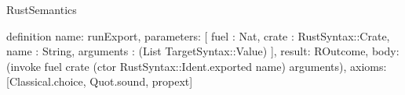 \begin{lexlean}{RustSemantics}
\begin{semanticmodule}
definition{
  name: runExport,
  parameters: [
    fuel : Nat,
    crate : RustSyntax::Crate,
    name : String,
    arguments : (List TargetSyntax::Value)
  ],
  result: ROutcome,
  body: (invoke fuel crate (ctor RustSyntax::Ident.exported name) arguments),
  axioms: [Classical.choice, Quot.sound, propext]
}
\end{semanticmodule}
\end{lexlean}
